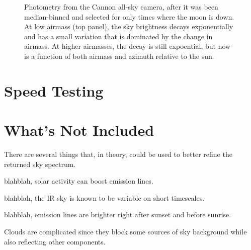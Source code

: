\documentclass{emulateapj}  %
\begin{document}
\begin{figure*}
  \caption{Photometry from the Cannon all-sky camera, after it was been median-binned and selected for only times where the moon is down.  At low airmass (top panel), the sky brightness decays exponentially and has a small variation that is dominated by the change in airmass.  At higher airmasses, the decay is still expoential, but now is a function of both airmass and azimuth relative to the sun.}
\end{figure*}


\section{Speed Testing}


\section{What's Not Included}

There are several things that, in theory, could be used to better refine the returned sky spectrum.

blahblah, solar activity can boost emission lines.

blahblah, the IR sky is known to be variable on short timescales.

blahblah, emission lines are brighter right after sunset and before sunrise.

Clouds are complicated since they block some sources of sky background while also reflecting other components.  



\end{document}
